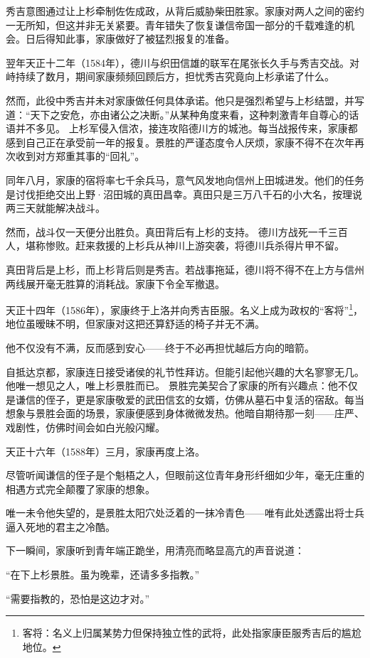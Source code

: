 \documentclass[
]{book}
\begin{document}
秀吉意图通过让上杉牵制佐佐成政，从背后威胁柴田胜家。家康对两人之间的密约一无所知，但这并非无关紧要。青年错失了恢复谦信帝国一部分的千载难逢的机会。日后得知此事，家康做好了被猛烈报复的准备。

翌年天正十二年（1584年），德川与织田信雄的联军在尾张长久手与秀吉交战。对峙持续了数月，期间家康频频回顾后方，担忧秀吉究竟向上杉承诺了什么。

然而，此役中秀吉并未对家康做任何具体承诺。他只是强烈希望与上杉结盟，并写道：``天下之安危，亦由诸公之决断。''从某种角度来看，这种刺激青年自尊心的话语并不多见。
上杉军侵入信浓，接连攻陷德川方的城池。每当战报传来，家康都感到自己正在承受前一年的报复。景胜的严谨态度令人厌烦，家康不得不在次年再次收到对方郑重其事的``回礼''。

同年八月，家康的宿将率七千余兵马，意气风发地向信州上田城进发。他们的任务是讨伐拒绝交出上野·沼田城的真田昌幸。真田只是三万八千石的小大名，按理说两三天就能解决战斗。

然而，战斗仅一天便分出胜负。真田背后有上杉的支持。
德川方战死一千三百人，堪称惨败。赶来救援的上杉兵从神川上游突袭，将德川兵杀得片甲不留。

真田背后是上杉，而上杉背后则是秀吉。若战事拖延，德川将不得不在上方与信州两线展开毫无胜算的消耗战。家康下令全军撤退。

天正十四年（1586年），家康终于上洛并向秀吉臣服。名义上成为政权的``客将''\footnote{客将：名义上归属某势力但保持独立性的武将，此处指家康臣服秀吉后的尴尬地位。}，地位虽暧昧不明，但家康对这把还算舒适的椅子并无不满。

他不仅没有不满，反而感到安心------终于不必再担忧越后方向的暗箭。

自抵达京都，家康连日接受诸侯的礼节性拜访。但能引起他兴趣的大名寥寥无几。他唯一想见之人，唯上杉景胜而已。
景胜完美契合了家康的所有兴趣点：他不仅是谦信的侄子，更是家康敬爱的武田信玄的女婿，仿佛从墓石中复活的宿敌。每当想象与景胜会面的场景，家康便感到身体微微发热。他暗自期待那一刻------庄严、戏剧性，仿佛时间会如白光般闪耀。

天正十六年（1588年）三月，家康再度上洛。

尽管听闻谦信的侄子是个魁梧之人，但眼前这位青年身形纤细如少年，毫无庄重的相遇方式完全颠覆了家康的想象。

唯一未令他失望的，是景胜太阳穴处泛着的一抹冷青色------唯有此处透露出将士兵逼入死地的君主之冷酷。

下一瞬间，家康听到青年端正跪坐，用清亮而略显高亢的声音说道：

``在下上杉景胜。虽为晚辈，还请多多指教。''

``需要指教的，恐怕是这边才对。''
\end{document}
